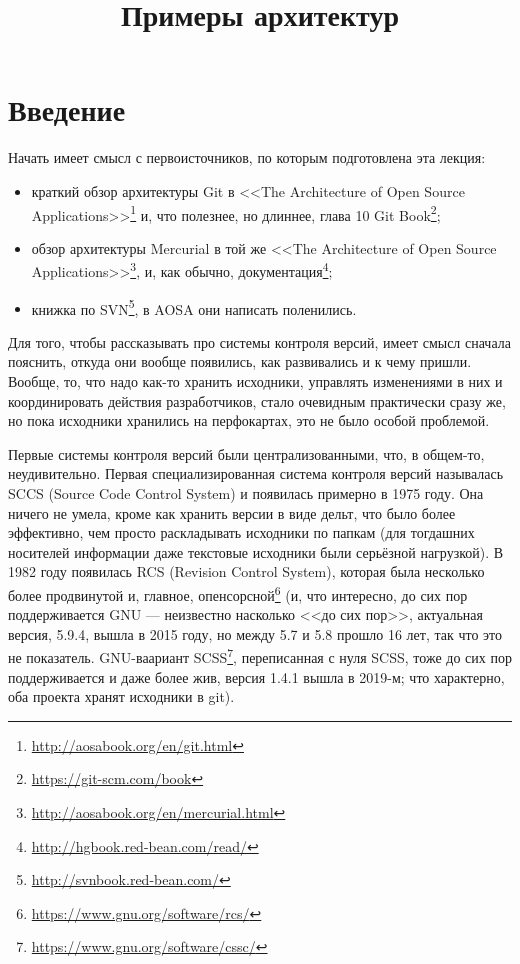 \documentclass[a5paper]{article}
\title{Примеры архитектур}
\date{}
\begin{document}
\maketitle
\thispagestyle{empty}

\section{Введение}

Начать имеет смысл с первоисточников, по которым подготовлена эта лекция:
\begin{itemize}
	\item краткий обзор архитектуры Git в <<The Architecture of Open Source Applications>>\footnote{\url{http://aosabook.org/en/git.html}} и, что полезнее, но длиннее, глава 10 Git Book\footnote{\url{https://git-scm.com/book}};
	\item обзор архитектуры Mercurial в той же <<The Architecture of Open Source Applications>>\footnote{\url{http://aosabook.org/en/mercurial.html}}, и, как обычно, документация\footnote{\url{http://hgbook.red-bean.com/read/}};
	\item книжка по SVN\footnote{\url{http://svnbook.red-bean.com/}}, в AOSA они написать поленились.
\end{itemize}

Для того, чтобы рассказывать про системы контроля версий, имеет смысл сначала пояснить, откуда они вообще появились, как развивались и к чему пришли. Вообще, то, что надо как-то хранить исходники, управлять изменениями в них и координировать действия разработчиков, стало очевидным практически сразу же, но пока исходники хранились на перфокартах, это не было особой проблемой.

Первые системы контроля версий были централизованными, что, в общем-то, неудивительно. Первая специализированная система контроля версий называлась SCCS (Source Code Control System) и появилась примерно в 1975 году. Она ничего не умела, кроме как хранить версии в виде дельт, что было более эффективно, чем просто раскладывать исходники по папкам (для тогдашних носителей информации даже текстовые исходники были серьёзной нагрузкой). В 1982 году появилась RCS (Revision Control System), которая была несколько более продвинутой и, главное, опенсорсной\footnote{\url{https://www.gnu.org/software/rcs/}} (и, что интересно, до сих пор поддерживается GNU --- неизвестно насколько <<до сих пор>>, актуальная версия, 5.9.4, вышла в 2015 году, но между 5.7 и 5.8 прошло 16 лет, так что это не показатель. GNU-ваариант SCSS\footnote{\url{https://www.gnu.org/software/cssc/}}, переписанная с нуля SCSS, тоже до сих пор поддерживается и даже более жив, версия 1.4.1 вышла в 2019-м; что характерно, оба проекта хранят исходники в git).
\end{document}
